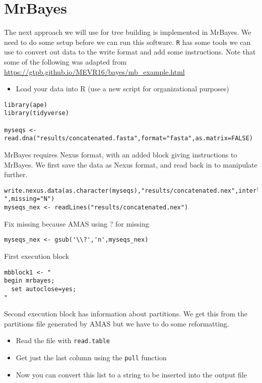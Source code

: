 \documentclass[
]{book}
\providecommand{\tightlist}{%
  \setlength{\itemsep}{0pt}\setlength{\parskip}{0pt}}
\begin{document}
\hypertarget{mrbayes}{%
\section{MrBayes}\label{mrbayes}}

The next approach we will use for tree building is implemented in MrBayes.
We need to do some setup before we can run this software.
\texttt{R} has some tools we can use to convert out data to the write format and add some instructions.
Note that some of the following was adapted from \url{https://gtpb.github.io/MEVR16/bayes/mb_example.html}

\begin{itemize}
\tightlist
\item
  Load your data into R (use a new script for organizational purposes)
\end{itemize}

\begin{verbatim}
library(ape)
library(tidyverse)

myseqs <- read.dna("results/concatenated.fasta",format="fasta",as.matrix=FALSE)
\end{verbatim}

MrBayes requires Nexus format, with an added block giving instructions to MrBayes. We first save the data as Nexus format, and read back in to manipulate further.

\begin{verbatim}
write.nexus.data(as.character(myseqs),"results/concatenated.nex",interleaved=TRUE,gap="-",missing="N")
myseqs_nex <- readLines("results/concatenated.nex")
\end{verbatim}

Fix missing because AMAS using ? for missing

\begin{verbatim}
myseqs_nex <- gsub('\\?','n',myseqs_nex)
\end{verbatim}

First execution block

\begin{verbatim}
mbblock1 <- "
begin mrbayes;
  set autoclose=yes;
"
\end{verbatim}

Second execution block has information about partitions.
We get this from the partitions file generated by AMAS but we have to do some reformatting.

\begin{itemize}
\tightlist
\item
  Read the file with \texttt{read.table}
\item
  Get just the last column using the \texttt{pull} function
\item
  Now you can convert this list to a string to be inserted into the output file
\end{itemize}
\end{document}
